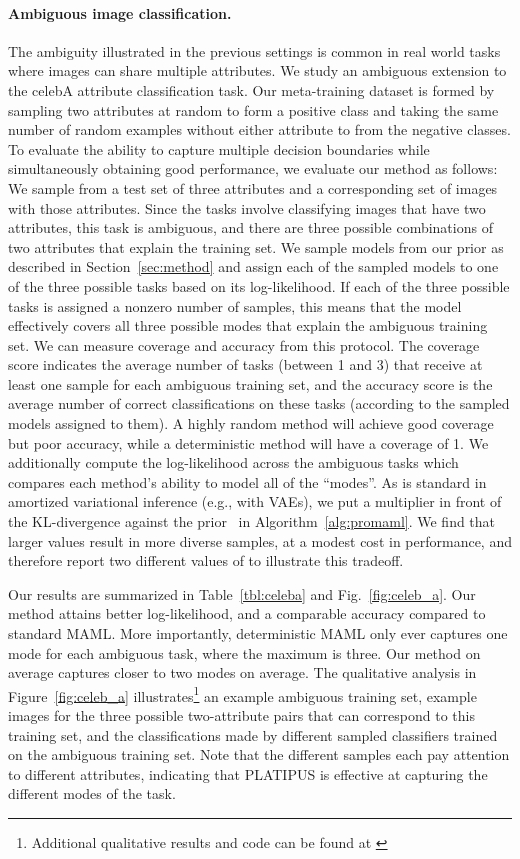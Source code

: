 \documentclass{article}
\begin{document}
\paragraph{Ambiguous image classification.}
The ambiguity illustrated in the previous settings is common in real world tasks where images can share multiple attributes. We study an ambiguous extension to the celebA attribute classification task. Our meta-training dataset is formed by sampling two attributes at random to form a positive class and taking the same number of random examples without either attribute to from the negative classes. 
To evaluate the ability to capture multiple decision boundaries while simultaneously obtaining good performance, we evaluate our method as follows: We sample from a test set of three attributes and a corresponding set of images with those attributes. Since the tasks involve classifying images that have two attributes, this task is ambiguous, and there are three possible combinations of two attributes that explain the training set. We sample models from our prior as described in Section~\ref{sec:method} and assign each of the sampled models to one of the three possible tasks based on its log-likelihood. If each of the three possible tasks is assigned a nonzero number of samples, this means that the model effectively covers all three possible modes that explain the ambiguous training set. We can measure coverage and accuracy from this protocol. The coverage score indicates the average number of tasks (between 1 and 3) that receive at least one sample for each ambiguous training set, and the accuracy score is the average number of correct classifications on these tasks (according to the sampled models assigned to them). A highly random method will achieve good coverage but poor accuracy, while a deterministic method will have a coverage of 1. We additionally compute the log-likelihood across the ambiguous tasks which compares each method's ability to model all of the ``modes''. As is standard in amortized variational inference (e.g., with VAEs), we put a multiplier  in front of the KL-divergence against the prior~\cite{higgins2017early} in Algorithm~\ref{alg:promaml}. We find that larger values result in more diverse samples, at a modest cost in performance, and therefore report two different values of  to illustrate this tradeoff.

Our results are summarized in Table~\ref{tbl:celeba} and Fig.~\ref{fig:celeb_a}. Our method attains better log-likelihood, and a comparable accuracy compared to standard MAML. More importantly, deterministic MAML only ever captures one mode for each ambiguous task, where the maximum is three. Our method on average captures closer to two modes on average. The qualitative analysis in Figure~\ref{fig:celeb_a} illustrates\footnote{Additional qualitative results and code can be found at \hyperlink{\website}{\website}} an example ambiguous training set, example images for the three possible two-attribute pairs that can correspond to this training set, and the classifications made by different sampled classifiers trained on the ambiguous training set. Note that the different samples each pay attention to different attributes, indicating that PLATIPUS is effective at capturing the different modes of the task.
\end{document}
